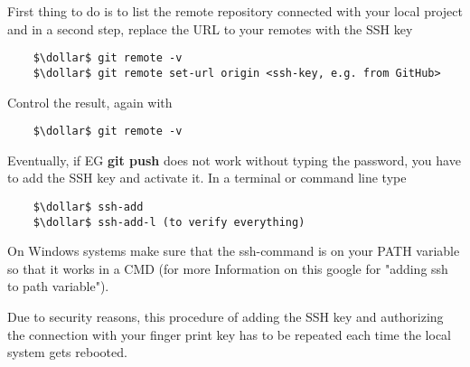 First thing to do is to list the remote repository connected with your local project and in a second step, replace the URL to your remotes 
with the SSH key

\begin{lstlisting}
	$\dollar$ git remote -v
	$\dollar$ git remote set-url origin <ssh-key, e.g. from GitHub>
\end{lstlisting}
Control the result, again with
\begin{lstlisting}
	$\dollar$ git remote -v
\end{lstlisting}
Eventually, if \ac{EG} \textbf{git push} does not work without typing the password, you have to add the SSH key and activate it. In a terminal or command line type
\begin{lstlisting}
	$\dollar$ ssh-add
	$\dollar$ ssh-add-l (to verify everything)
\end{lstlisting}
On Windows  systems make sure that the ssh-command is on your PATH variable so that it works in a CMD (for more Information on this google for "adding ssh to path variable").

Due to security reasons, this procedure of adding the SSH key and authorizing the connection with your finger print key has to be repeated each time the local system 
gets rebooted. 









